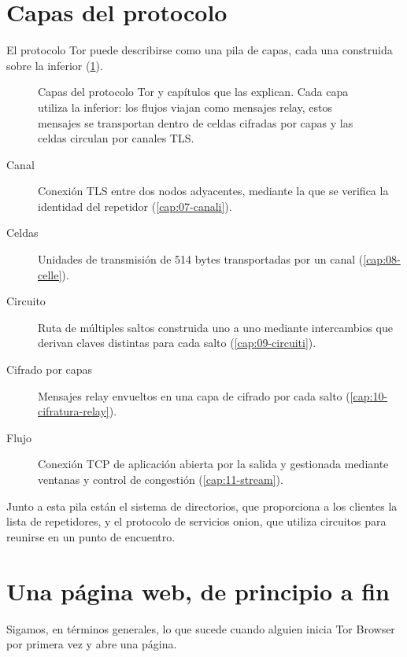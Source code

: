 \section{Capas del protocolo}\label{sec:arch-livelli}

El protocolo Tor puede describirse como una pila de capas, cada una construida sobre la inferior (\cref{fig:arch-livelli}).

\begin{figure}[htbp]
\centering

\caption{Capas del protocolo Tor y capítulos que las explican. Cada capa utiliza la inferior: los flujos viajan como mensajes relay, estos mensajes se transportan dentro de celdas cifradas por capas y las celdas circulan por canales TLS.}
\label{fig:arch-livelli}
\end{figure}

\begin{description}
  \item[Canal] Conexión TLS entre dos nodos adyacentes, mediante la que se verifica la identidad del repetidor (\cref{cap:07-canali}).
  \item[Celdas] Unidades de transmisión de 514 bytes transportadas por un canal (\cref{cap:08-celle}).
  \item[Circuito] Ruta de múltiples saltos construida uno a uno mediante intercambios que derivan claves distintas para cada salto (\cref{cap:09-circuiti}).
  \item[Cifrado por capas] Mensajes relay envueltos en una capa de cifrado por cada salto (\cref{cap:10-cifratura-relay}).
  \item[Flujo] Conexión TCP de aplicación abierta por la salida y gestionada mediante ventanas y control de congestión (\cref{cap:11-stream}).
\end{description}

Junto a esta pila están el sistema de directorios, que proporciona a los clientes la lista de repetidores, y el protocolo de servicios onion, que utiliza circuitos para reunirse en un punto de encuentro.

\section{Una página web, de principio a fin}\label{sec:arch-percorso}

Sigamos, en términos generales, lo que sucede cuando alguien inicia Tor Browser por primera vez y abre una página.

